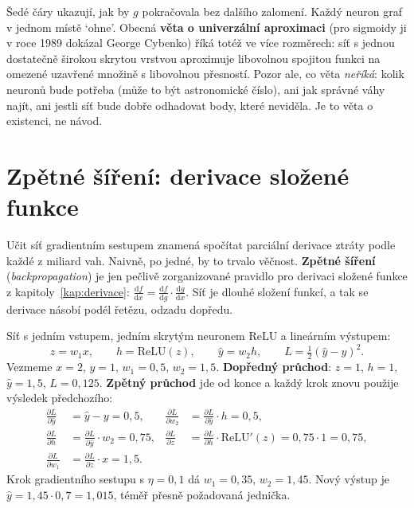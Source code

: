 Šedé čáry ukazují, jak by $g$ pokračovala bez dalšího zalomení. Každý neuron graf v jednom místě `ohne'. Obecná \textbf{věta o univerzální aproximaci} (pro sigmoidy ji v roce 1989 dokázal George Cybenko) říká totéž ve více rozměrech: síť s jednou dostatečně širokou skrytou vrstvou aproximuje libovolnou spojitou funkci na omezené uzavřené množině s libovolnou přesností. Pozor ale, co věta \textit{neříká}: kolik neuronů bude potřeba (může to být astronomické číslo), ani jak správné váhy najít, ani jestli síť bude dobře odhadovat body, které neviděla. Je to věta o existenci, ne návod.

\section{Zpětné šíření: derivace složené funkce}

Učit síť gradientním sestupem znamená spočítat parciální derivace ztráty podle každé z miliard vah. Naivně, po jedné, by to trvalo věčnost. \textbf{Zpětné šíření} (\textit{backpropagation}) je jen pečlivě zorganizované pravidlo pro derivaci složené funkce z kapitoly~\ref{kap:derivace}: $\frac{\mathrm{d}f}{\mathrm{d}x} = \frac{\mathrm{d}f}{\mathrm{d}g}\cdot\frac{\mathrm{d}g}{\mathrm{d}x}$. Síť je dlouhé složení funkcí, a tak se derivace násobí podél řetězu, odzadu dopředu.

\begin{example}
  Síť s jedním vstupem, jedním skrytým neuronem ReLU a lineárním výstupem:
  \begin{equation*}
    z = w_1x,\qquad h = \mathrm{ReLU}(z),\qquad\hat{y} = w_2h,\qquad L = \tfrac{1}{2}{(\hat{y} - y)}^2.
  \end{equation*}
  Vezmeme $x = 2$, $y = 1$, $w_1 = 0{,}5$, $w_2 = 1{,}5$. \textbf{Dopředný průchod}: $z = 1$, $h = 1$, $\hat{y} = 1{,}5$, $L = 0{,}125$. \textbf{Zpětný průchod} jde od konce a každý krok znovu použije výsledek předchozího:
  \begin{align*}
    \frac{\partial L}{\partial\hat{y}} &= \hat{y} - y = 0{,}5, & \frac{\partial L}{\partial w_2} &= \frac{\partial L}{\partial\hat{y}}\cdot h = 0{,}5,\\
    \frac{\partial L}{\partial h} &= \frac{\partial L}{\partial\hat{y}}\cdot w_2 = 0{,}75, & \frac{\partial L}{\partial z} &= \frac{\partial L}{\partial h}\cdot\mathrm{ReLU}'(z) = 0{,}75\cdot 1 = 0{,}75,\\
    \frac{\partial L}{\partial w_1} &= \frac{\partial L}{\partial z}\cdot x = 1{,}5.
  \end{align*}
  Krok gradientního sestupu s $\eta = 0{,}1$ dá $w_1 = 0{,}35$, $w_2 = 1{,}45$. Nový výstup je $\hat{y} = 1{,}45\cdot 0{,}7 = 1{,}015$, téměř přesně požadovaná jednička.
\end{example}

